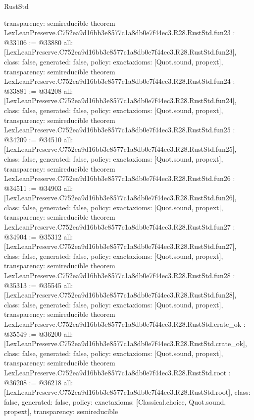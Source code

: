 \begin{lexlean}{RustStd}
\begin{coremodule}
{  transparency: semireducible
}
theorem LexLeanPreserve.C752ea9d16bb3e8577c1a8db0e7f44ec3.R28.RustStd.fun23 : @33106 := @33880 {
  all: [LexLeanPreserve.C752ea9d16bb3e8577c1a8db0e7f44ec3.R28.RustStd.fun23],
  class: false,
  generated: false,
  policy: exact{axioms: [Quot.sound, propext]},
  transparency: semireducible
}
theorem LexLeanPreserve.C752ea9d16bb3e8577c1a8db0e7f44ec3.R28.RustStd.fun24 : @33881 := @34208 {
  all: [LexLeanPreserve.C752ea9d16bb3e8577c1a8db0e7f44ec3.R28.RustStd.fun24],
  class: false,
  generated: false,
  policy: exact{axioms: [Quot.sound, propext]},
  transparency: semireducible
}
theorem LexLeanPreserve.C752ea9d16bb3e8577c1a8db0e7f44ec3.R28.RustStd.fun25 : @34209 := @34510 {
  all: [LexLeanPreserve.C752ea9d16bb3e8577c1a8db0e7f44ec3.R28.RustStd.fun25],
  class: false,
  generated: false,
  policy: exact{axioms: [Quot.sound, propext]},
  transparency: semireducible
}
theorem LexLeanPreserve.C752ea9d16bb3e8577c1a8db0e7f44ec3.R28.RustStd.fun26 : @34511 := @34903 {
  all: [LexLeanPreserve.C752ea9d16bb3e8577c1a8db0e7f44ec3.R28.RustStd.fun26],
  class: false,
  generated: false,
  policy: exact{axioms: [Quot.sound, propext]},
  transparency: semireducible
}
theorem LexLeanPreserve.C752ea9d16bb3e8577c1a8db0e7f44ec3.R28.RustStd.fun27 : @34904 := @35312 {
  all: [LexLeanPreserve.C752ea9d16bb3e8577c1a8db0e7f44ec3.R28.RustStd.fun27],
  class: false,
  generated: false,
  policy: exact{axioms: [Quot.sound, propext]},
  transparency: semireducible
}
theorem LexLeanPreserve.C752ea9d16bb3e8577c1a8db0e7f44ec3.R28.RustStd.fun28 : @35313 := @35545 {
  all: [LexLeanPreserve.C752ea9d16bb3e8577c1a8db0e7f44ec3.R28.RustStd.fun28],
  class: false,
  generated: false,
  policy: exact{axioms: [Quot.sound, propext]},
  transparency: semireducible
}
theorem LexLeanPreserve.C752ea9d16bb3e8577c1a8db0e7f44ec3.R28.RustStd.crate_ok : @35549 := @36200 {
  all: [LexLeanPreserve.C752ea9d16bb3e8577c1a8db0e7f44ec3.R28.RustStd.crate_ok],
  class: false,
  generated: false,
  policy: exact{axioms: [Quot.sound, propext]},
  transparency: semireducible
}
theorem LexLeanPreserve.C752ea9d16bb3e8577c1a8db0e7f44ec3.R28.RustStd.root : @36208 := @36218 {
  all: [LexLeanPreserve.C752ea9d16bb3e8577c1a8db0e7f44ec3.R28.RustStd.root],
  class: false,
  generated: false,
  policy: exact{axioms: [Classical.choice, Quot.sound, propext]},
  transparency: semireducible
}


\end{coremodule}
\end{lexlean}
